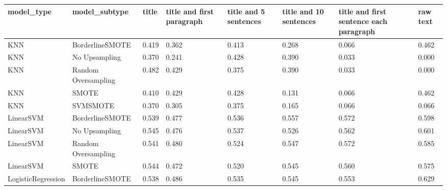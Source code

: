 \begin{tabular}{llllllll}
\toprule
                  model\_type &       model\_subtype & title & title and first paragraph & title and 5 sentences & title and 10 sentences & title and first sentence each paragraph &  raw text \\
\midrule
                         KNN &     BorderlineSMOTE & 0.419 &                     0.362 &                 0.413 &                  0.268 &                                   0.066 &     0.462 \\
                         KNN &       No Upsampling & 0.370 &                     0.241 &                 0.428 &                  0.390 &                                   0.033 &     0.000 \\
                         KNN & Random Oversampling & 0.482 &                     0.429 &                 0.375 &                  0.390 &                                   0.033 &     0.000 \\
                         KNN &               SMOTE & 0.410 &                     0.429 &                 0.428 &                  0.131 &                                   0.066 &     0.462 \\
                         KNN &            SVMSMOTE & 0.370 &                     0.305 &                 0.375 &                  0.165 &                                   0.066 &     0.066 \\
                   LinearSVM &     BorderlineSMOTE & 0.539 &                     0.477 &                 0.536 &                  0.557 &                                   0.572 &     0.598 \\
                   LinearSVM &       No Upsampling & 0.545 &                     0.476 &                 0.537 &                  0.526 &                                   0.562 &     0.601 \\
                   LinearSVM & Random Oversampling & 0.541 &                     0.480 &                 0.524 &                  0.547 &                                   0.572 &     0.585 \\
                   LinearSVM &               SMOTE & 0.544 &                     0.472 &                 0.520 &                  0.545 &                                   0.560 &     0.575 \\
          LogisticRegression &     BorderlineSMOTE & 0.538 &                     0.486 &                 0.535 &                  0.545 &                                   0.553 &     0.629 \\

\end{tabular}
